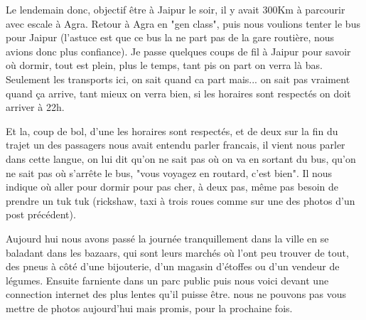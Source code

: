 \begin{multicols}{2}
Le lendemain donc, objectif être à Jaipur le soir, il y avait 300Km à parcourir avec escale à Agra. Retour à Agra en "gen class", puis nous voulions tenter le bus pour Jaipur (l'astuce est que ce bus la ne part pas de la gare routière, nous avions donc plus confiance). Je passe quelques coups de fil à Jaipur pour savoir où dormir, tout est plein, plus le temps, tant pis on part on verra là bas. Seulement les transports ici, on sait quand ca part mais... on sait pas vraiment quand ça arrive, tant mieux on verra bien, si les horaires sont respectés on doit arriver à 22h.

Et la, coup de bol, d'une les horaires sont respectés, et de deux sur la fin du trajet un des passagers nous avait entendu parler francais, il vient nous parler dans cette langue, on lui dit qu'on ne sait pas où on va en sortant du bus, qu'on ne sait pas où s'arrête le bus, "vous voyagez en routard, c'est bien". Il nous indique où aller pour dormir pour pas cher, à deux pas, même pas besoin de prendre un tuk tuk (rickshaw, taxi à trois roues comme sur une des photos d'un post précédent).

Aujourd hui nous avons passé la journée tranquillement dans la ville en se baladant dans les bazaars, qui sont leurs marchés où l'ont peu trouver de tout, des pneus à côté d'une bijouterie, d'un magasin d'étoffes ou d'un vendeur de légumes. Ensuite farniente dans un parc public puis nous voici devant une connection internet des plus lentes qu'il puisse être. nous ne pouvons pas vous mettre de photos aujourd'hui mais promis, pour la prochaine fois.

\end{multicols}
